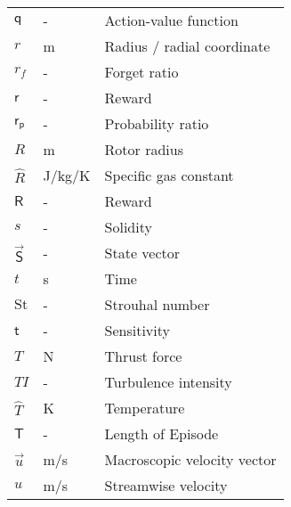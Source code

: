 \begin{longtable}{p{5cm}p{4cm}p{5cm}}
    $\mathsf{q}$			& \si{-}		& Action-value function \\
    $r$						& \si{m}		& Radius / radial coordinate \\
    $r_f$					& \si{-}		& Forget ratio \\
    $\mathsf{r}$			& \si{-}		& Reward \\	
    $\mathsf{r_p}$			& \si{-}		& Probability ratio \\
    $R$						& \si{m}		& Rotor radius \\
    $\hat{R}$               & \si{J/kg/K} 	& Specific gas constant \\ 
    $\mathsf{R}$			& \si{-}		& Reward \\	
    $s$						& \si{-}		& Solidity \\
    $\vec{\mathsf{S}}$		& \si{-}		& State vector \\
    $t$                     & \si{s}      	& Time  \\
    $\mathrm{St}$			& \si{-}		& Strouhal number \\
    $\mathsf{t}$			& \si{-}		& Sensitivity \\
    $T$                     & \si{N}      	& Thrust force \\
    $TI$					& \si{-}		& Turbulence intensity \\
    $\hat{T}$				& \si{K}		& Temperature \\
    $\mathsf{T}$			& \si{-}		& Length of Episode \\
    $\vec{u}$               & \si{m/s}    	& Macroscopic velocity vector \\
    $u$                     & \si{m/s}    	& Streamwise velocity \\

\end{longtable}
